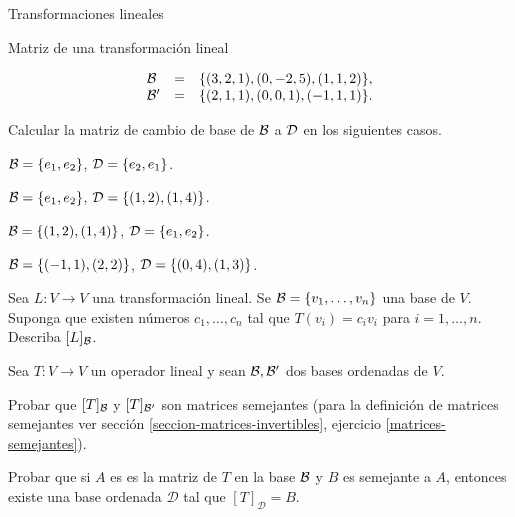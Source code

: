 \begin{chapter}{Transformaciones lineales}
\begin{section}{Matriz de una transformaci\'on lineal}
\begin{enumex}
\begin{enumex}
\begin{minipage}{0.5\textwidth}
                    \begin{equation*}
                        \begin{array}{lll}
                            \mathcal{B} &=&\{(3, 2,1), (0, -2,5), (1,1, 2)\}, \\
                            \mathcal{B}' &=&\{(2, 1, 1), (0, 0, 1), ( -1, 1, 1)\}.
                        \end{array}
                    \end{equation*}
                \end{minipage}
            \end{enumex}
            \item Calcular la matriz de cambio de base de $\mathcal{B}$ a $\mathcal{D}$ en los siguientes casos. 
            \begin{enumex}
                \begin{minipage}{0.4\textwidth}
                    \item $\mathcal{B} = \{ e_1,e_2\}$, $\mathcal{D} = \{e_2,e_1\}$.
                \end{minipage}
                \begin{minipage}{0.4\textwidth}
                    \item $\mathcal{B} = \{e_1,e_2 \}$, $\mathcal{D} = \{(1,2),(1,4) \}$.
                \end{minipage}
            
                    \item $\mathcal{B} = \{(1,2),(1,4) \}$, $\mathcal{D} =\{e_1,e_2 \}$.

                    \item $\mathcal{B} = \{(-1,1),(2,2)  \}$, $\mathcal{D} = \{(0,4),(1,3)  \}$.
 
            \end{enumex}
            \item  Sea $L: V \to V$ una transformación lineal. Se  $\mathcal{B} =\{v_1,\ldots,v_n\}$ una base de $V$. Suponga que existen números $c_1,\ldots,c_n$ tal que $T(v_i) = c_iv_i$ para $i=1,\ldots,n$. Describa $[L]_{\mathcal{B}}$.
            
            \item Sea $T: V \to V$ un operador lineal y sean $\mathcal{B}, \mathcal{B}'$ dos bases ordenadas de $V$. 
                \begin{enumex}
                    \item Probar que $[T]_{\mathcal{B}}$ y $[T]_{\mathcal{B}'}$  son matrices semejantes (para la definición de matrices semejantes ver sección \ref{seccion-matrices-invertibles}, ejercicio \ref{matrices-semejantes}). 
                    \item Probar que si $A$ es es la matriz de $T$  en la base $\mathcal{B}$ y $B$ es semejante a $A$,  entonces existe una base ordenada $\mathcal{D}$ tal que $[T]_{\mathcal{D}}=B$.  
                \end{enumex}
        \end{enumex}



\end{section}
\end{chapter}
